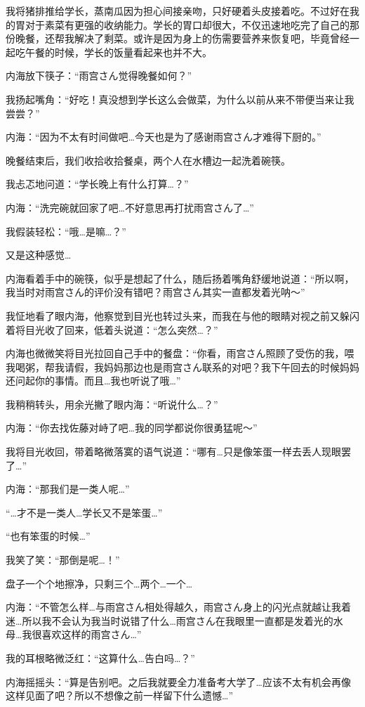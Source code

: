 我将猪排推给学长，蒸南瓜因为担心间接亲吻，只好硬着头皮接着吃。不过好在我的胃对于素菜有更强的收纳能力。学长的胃口却很大，不仅迅速地吃完了自己的那份晚餐，还帮我解决了剩菜。或许是因为身上的伤需要营养来恢复吧，毕竟曾经一起吃午餐的时候，学长的饭量看起来也并不大。

内海放下筷子：“雨宫さん觉得晚餐如何？”

我扬起嘴角：“好吃！真没想到学长这么会做菜，为什么以前从来不带便当来让我尝尝？”

内海：“因为不太有时间做吧…今天也是为了感谢雨宫さん才难得下厨的。”

晚餐结束后，我们收拾收拾餐桌，两个人在水槽边一起洗着碗筷。

我忐忑地问道：“学长晚上有什么打算…？”

内海：“洗完碗就回家了吧…不好意思再打扰雨宫さん了…”

我假装轻松：“哦…是嘛…？”

又是这种感觉…

内海看着手中的碗筷，似乎是想起了什么，随后扬着嘴角舒缓地说道：“所以啊，我当时对雨宫さん的评价没有错吧？雨宫さん其实一直都发着光呐～”

我怔地看了眼内海，他察觉到目光也转过头来，而我在与他的眼睛对视之前又躲闪着将目光收了回来，低着头说道：“怎么突然…？”

内海也微微笑将目光拉回自己手中的餐盘：“你看，雨宫さん照顾了受伤的我，喂我喝粥，帮我请假，我妈妈那边也是雨宫さん联系的对吧？我下午回去的时候妈妈还问起你的事情。而且…我也听说了哦…”

我稍稍转头，用余光撇了眼内海：“听说什么…？”

内海：“你去找佐藤对峙了吧…我的同学都说你很勇猛呢～”

我将目光收回，带着略微落寞的语气说道：“哪有…只是像笨蛋一样去丢人现眼罢了…”

内海：“那我们是一类人呢…”

“…才不是一类人…学长又不是笨蛋…”

“也有笨蛋的时候…”

我笑了笑：“那倒是呢…！”

盘子一个个地擦净，只剩三个…两个…一个…

内海：“不管怎么样…与雨宫さん相处得越久，雨宫さん身上的闪光点就越让我着迷…所以我不会认为我当时说错了什么…雨宫さん在我眼里一直都是发着光的水母…我很喜欢这样的雨宫さん…”

我的耳根略微泛红：“这算什么…告白吗…？”

内海摇摇头：“算是告别吧。之后我就要全力准备考大学了…应该不太有机会再像这样见面了吧？所以不想像之前一样留下什么遗憾…”

